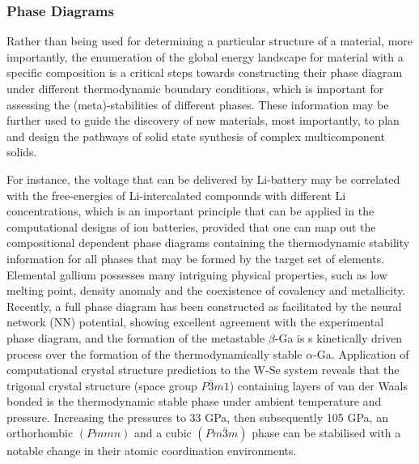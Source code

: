\subsubsection{Phase Diagrams} Rather than being used for determining a particular structure of a material, more importantly, the enumeration of the global energy landscape for material with a specific composition is a critical steps towards constructing their phase diagram under different thermodynamic boundary conditions, which is important for assessing the (meta)-stabilities of different phases.\cite{nyman2015static,sun2016thermodynamic} These information may be further used to guide the discovery  of new materials,\cite{aykol2018thermodynamic} most importantly, to plan and design the pathways of solid state synthesis of complex multicomponent solids.\cite{hautier2012accuracy,mcdermott2021graph} 

For instance, the voltage that can be delivered by Li-battery may be correlated with the free-energies of  Li-intercalated compounds with different Li concentrations,\cite{van2013understanding} which is an important principle that can be applied in the computational designs of ion batteries, provided that one can map out the compositional dependent phase diagrams containing the thermodynamic stability information for all phases that may be formed by the target set of elements. \cite{doe2008first,albina2018finite} Elemental gallium possesses many intriguing physical properties, such as low melting point, density anomaly and the coexistence of covalency and metallicity. Recently, a full phase diagram has been constructed as facilitated by the neural network (NN) potential, showing excellent agreement with the experimental phase diagram, and the formation of the metastable $\beta$-Ga is s kinetically driven process over the formation of the thermodynamically stable $\alpha$-Ga.\cite{niu2020ab} Application of computational crystal structure prediction to the W-Se system\cite{zhu2020ab} reveals that the trigonal crystal structure (space group $P\bar{3}m1$) containing layers of van der Waals bonded  is the thermodynamic stable phase under ambient temperature and pressure. Increasing the pressures to 33 GPa, then subsequently 105 GPa, an orthorhombic $(Pmmn)$ and a cubic $(Pm\bar{3}m)$ phase can be stabilised with a notable change in their atomic coordination environments. 

